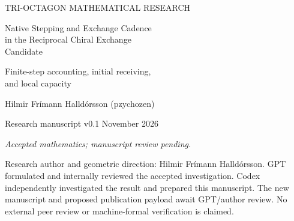 \documentclass[11pt,a4paper]{article}
\numberwithin{equation}{section}
\begin{document}
\hypersetup{pageanchor=false}
\begin{titlepage}
\vspace*{2mm}
{\small\color{MidnightBlue} TRI-OCTAGON MATHEMATICAL RESEARCH\par}
\vspace{7mm}
{\LARGE\bfseries\raggedright Native Stepping and Exchange Cadence\\
in the Reciprocal Chiral Exchange\\Candidate\par}
\vspace{5mm}
{\large Finite-step accounting, initial receiving,\\and local capacity\par}
\vspace{6mm}
{\large Hilmir Fr\'imann Halld\'orsson (pzychozen)\par}
\vspace{3mm}
{Research manuscript v0.1 November 2026\par}
{\itshape Accepted mathematics; manuscript review pending.\par}
\vspace{4mm}
\begin{abstract}
The conservative reciprocal chiral exchange candidate admits an exact finite native update between exchange intervals. We examine the inherited native-first composition with a fixed symbolic positive cadence. Native baseline increments must be subtracted when attributing recovery to exchange; the invariant storage floor can change at a native jump, so the old capacity cannot in general be carried across unchanged. For the coherent empty launch $(1,e^{i\phi},1)$, $0<\phi\le1/100$ radians, the exact first baseline has both signs and the native update leaves the precise normalized launch family. Nevertheless, its synchronized source remains nonzero throughout this interval. For each fixed positive phase and finite positive exchange tuple, the actual post-update trajectory has strict initial native debit and receiver gain on a sufficiently short interval before the next jump. This interval is pointwise in phase and parameters. At fixed nonzero native detuning, a local capacity calculation gives a new-to-old algebraic ceiling ratio whose limit is approximately $1.132216337515111$; no attained-transfer claim follows. Strong continuity gives a one-step small-cadence limit equal to the finite native update, with a separate qualified fixed-number-of-steps limit. The later capacity-sized receiving-and-recovery episode under native stepping remains unproved, and no physical cadence is selected.
\end{abstract}
\vfill
{\small Research author and geometric direction: Hilmir Fr\'imann Halld\'orsson.
GPT formulated and internally reviewed the accepted investigation.
Codex independently investigated the result and prepared this manuscript.
The new manuscript and proposed publication payload await GPT/author review.
No external peer review or machine-formal verification is claimed.}
\end{titlepage}
\setcounter{page}{2}\hypersetup{pageanchor=true}










\end{document}
